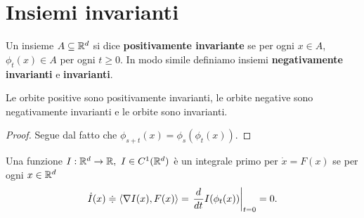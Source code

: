 \section{Insiemi invarianti}
\begin{definition}
Un insieme $A\subseteq \mathbb{R}^d$ si dice \textbf{positivamente invariante} se per ogni $x\in A$, $\phi_t(x)\in A$ per ogni $t\geq 0$. In modo simile definiamo insiemi \textbf{negativamente invarianti} e \textbf{invarianti}.
\end{definition}

\begin{remark}
Le orbite positive sono positivamente invarianti, le orbite negative sono negativamente invarianti e le orbite sono invarianti.
\end{remark}
\begin{proof}
Segue dal fatto che $\phi_{s+t}(x)=\phi_s(\phi_t(x))$.
\end{proof}

\begin{definition}
Una funzione $I:\mathbb{R}^d\to \mathbb{R},\ I\in C^1(\mathbb{R}^d)$ \`e un integrale primo per $\dot x=F(x)$ se per ogni $x\in\mathbb{R}^d$
\[\dot I(x)\doteqdot \ps{\nabla I(x),F(x)}=\rbar{\dd{t}{}I(\phi_t(x))}_{t=0}=0.\]
\end{definition}



